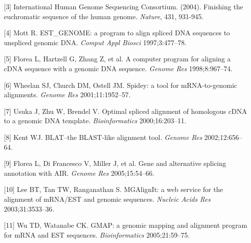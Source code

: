 \documentclass[12pt,a4paper]{article}
\begin{document}
[3] International Human Genome Sequencing Consortium. (2004). Finishing the euchromatic sequence of the human genome. \textit{Nature}, 431, 931-945.

[4] Mott R. EST\_GENOME: a program to align spliced DNA sequences to unspliced genomic DNA. \textit{Comput Appl Biosci} 1997;3:477–78.

[5] Florea L, Hartzell G, Zhang Z, et al. A computer program for aligning a cDNA sequence with a genomic DNA sequence. \textit{Genome Res} 1998;8:967–74.

[6] Wheelan SJ, Church DM, Ostell JM. Spidey: a tool for mRNA-to-genomic alignments. \textit{Genome Res} 2001;11:1952–57.

[7] Usuka J, Zhu W, Brendel V. Optimal spliced alignment of homologous cDNA to a genomic DNA template. \textit{Bioinformatics} 2000;16:203–11.

[8] Kent WJ. BLAT–the BLAST-like alignment tool. \textit{Genome Res} 2002;12:656–64.

[9] Florea L, Di Francesco V, Miller J, et al. Gene and alternative splicing annotation with AIR. \textit{Genome Res} 2005;15:54–66.

[10] Lee BT, Tan TW, Ranganathan S. MGAlignIt: a web service for the alignment of mRNA/EST and genomic sequences. \textit{Nucleic Acids Res} 2003;31:3533–36.

[11] Wu TD, Watanabe CK. GMAP: a genomic mapping and alignment program for mRNA and EST sequences. \textit{Bioinformatics} 2005;21:59–75.
\end{document}
